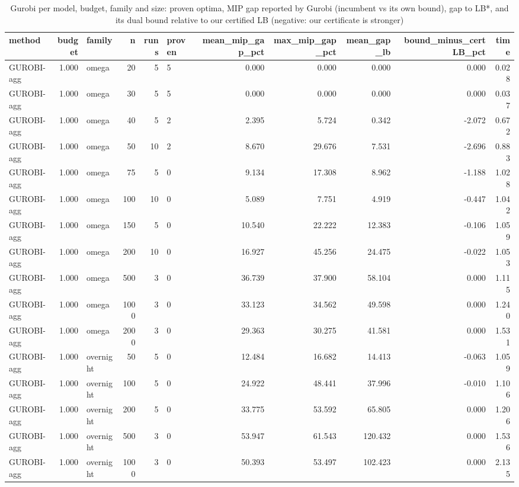 \begin{table}[htbp]
\centering
\small
\caption{Gurobi per model, budget, family and size: proven optima, MIP gap reported by Gurobi (incumbent vs its own bound), gap to LB*, and its dual bound relative to our certified LB (negative: our certificate is stronger)}
\label{tab:E4a_equal_budgets_gurobi}
\begin{tabular}{lrlrrlrrrrr}
\toprule
method & budget & family & n & runs & proven & mean\_mip\_gap\_pct & max\_mip\_gap\_pct & mean\_gap\_lb & bound\_minus\_certLB\_pct & time \\
\midrule
GUROBI-agg & 1.000 & omega & 20 & 5 & 5 & 0.000 & 0.000 & 0.000 & 0.000 & 0.028 \\
GUROBI-agg & 1.000 & omega & 30 & 5 & 5 & 0.000 & 0.000 & 0.000 & 0.000 & 0.037 \\
GUROBI-agg & 1.000 & omega & 40 & 5 & 2 & 2.395 & 5.724 & 0.342 & -2.072 & 0.672 \\
GUROBI-agg & 1.000 & omega & 50 & 10 & 2 & 8.670 & 29.676 & 7.531 & -2.696 & 0.883 \\
GUROBI-agg & 1.000 & omega & 75 & 5 & 0 & 9.134 & 17.308 & 8.962 & -1.188 & 1.028 \\
GUROBI-agg & 1.000 & omega & 100 & 10 & 0 & 5.089 & 7.751 & 4.919 & -0.447 & 1.042 \\
GUROBI-agg & 1.000 & omega & 150 & 5 & 0 & 10.540 & 22.222 & 12.383 & -0.106 & 1.059 \\
GUROBI-agg & 1.000 & omega & 200 & 10 & 0 & 16.927 & 45.256 & 24.475 & -0.022 & 1.053 \\
GUROBI-agg & 1.000 & omega & 500 & 3 & 0 & 36.739 & 37.900 & 58.104 & 0.000 & 1.115 \\
GUROBI-agg & 1.000 & omega & 1000 & 3 & 0 & 33.123 & 34.562 & 49.598 & 0.000 & 1.240 \\
GUROBI-agg & 1.000 & omega & 2000 & 3 & 0 & 29.363 & 30.275 & 41.581 & 0.000 & 1.531 \\
GUROBI-agg & 1.000 & overnight & 50 & 5 & 0 & 12.484 & 16.682 & 14.413 & -0.063 & 1.059 \\
GUROBI-agg & 1.000 & overnight & 100 & 5 & 0 & 24.922 & 48.441 & 37.996 & -0.010 & 1.106 \\
GUROBI-agg & 1.000 & overnight & 200 & 5 & 0 & 33.775 & 53.592 & 65.805 & 0.000 & 1.206 \\
GUROBI-agg & 1.000 & overnight & 500 & 3 & 0 & 53.947 & 61.543 & 120.432 & 0.000 & 1.536 \\
GUROBI-agg & 1.000 & overnight & 1000 & 3 & 0 & 50.393 & 53.497 & 102.423 & 0.000 & 2.135 \\

\end{tabular}
\end{table}
